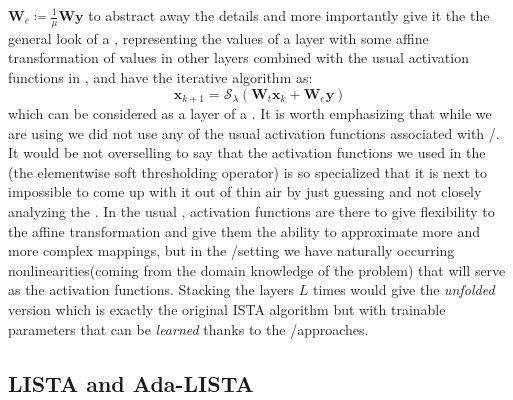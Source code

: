 $\boldsymbol{W}_e \coloneqq \frac{1}{\mu}\boldsymbol{W}\boldsymbol{y}$ to abstract away the details and more importantly give it the the general look of a \nn, representing the values of a layer with 
some affine transformation of values in other layers combined with the usual activation functions in \nn, and have the iterative algorithm 
as:
\begin{equation}
  \boldsymbol{x}_{k+1} = \mathcal{S}_\lambda\left(\boldsymbol{W}_t\boldsymbol{x}_{k}+\boldsymbol{W}_e\boldsymbol{y}\right)
\end{equation}
which can be considered as a layer of a \nn. It is worth emphasizing that 
while we are using \nns we did not use any of the usual activation functions associated with \ml/\dl. 
It would be not overselling to say that the activation functions we used in the \srp(the elementwise soft thresholding operator) is so 
specialized that it is next to impossible to come up with it out of thin air by just guessing and not closely analyzing the \srp.
In the usual \nns, activation functions are there to give flexibility to the affine transformation 
and give them the ability to approximate more and more complex mappings, but in the \du/\au setting we have naturally occurring 
nonlinearities(coming from the domain knowledge of the problem) that will serve as the activation 
functions. Stacking the layers $L$ times would give the \emph{unfolded} version which is exactly the original \ac{ISTA} 
algorithm but with trainable parameters that can be \emph{learned} thanks to the \ml/\dl approaches.

\subsection{LISTA and Ada-LISTA}

